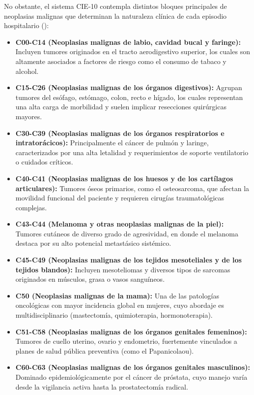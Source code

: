 No obstante, el sistema CIE-10 contempla distintos bloques principales de neoplasias malignas que determinan la naturaleza clínica de cada episodio hospitalario (\cite{paho}):

\begin{itemize}
	\label{item:tipos_cancer}
    \item \textbf{C00-C14 (Neoplasias malignas de labio, cavidad bucal y faringe):} Incluyen tumores originados en el tracto aerodigestivo superior, los cuales son altamente asociados a factores de riesgo como el consumo de tabaco y alcohol.
    \item \textbf{C15-C26 (Neoplasias malignas de los órganos digestivos):} Agrupan tumores del esófago, estómago, colon, recto e hígado, los cuales representan una alta carga de morbilidad y suelen implicar resecciones quirúrgicas mayores.
    \item \textbf{C30-C39 (Neoplasias malignas de los órganos respiratorios e intratorácicos):} Principalmente el cáncer de pulmón y laringe, caracterizados por una alta letalidad y requerimientos de soporte ventilatorio o cuidados críticos.
    \item \textbf{C40-C41 (Neoplasias malignas de los huesos y de los cartílagos articulares):} Tumores óseos primarios, como el osteosarcoma, que afectan la movilidad funcional del paciente y requieren cirugías traumatológicas complejas.
    \item \textbf{C43-C44 (Melanoma y otras neoplasias malignas de la piel):} Tumores cutáneos de diverso grado de agresividad, en donde el melanoma destaca por su alto potencial metastásico sistémico.
    \item \textbf{C45-C49 (Neoplasias malignas de los tejidos mesoteliales y de los tejidos blandos):} Incluyen mesoteliomas y diversos tipos de sarcomas originados en músculos, grasa o vasos sanguíneos.
    \item \textbf{C50 (Neoplasias malignas de la mama):} Una de las patologías oncológicas con mayor incidencia global en mujeres, cuyo abordaje es multidisciplinario (mastectomía, quimioterapia, hormonoterapia).
    \item \textbf{C51-C58 (Neoplasias malignas de los órganos genitales femeninos):} Tumores de cuello uterino, ovario y endometrio, fuertemente vinculados a planes de salud pública preventiva (como el Papanicolaou).
    \item \textbf{C60-C63 (Neoplasias malignas de los órganos genitales masculinos):} Dominado epidemiológicamente por el cáncer de próstata, cuyo manejo varía desde la vigilancia activa hasta la prostatectomía radical.

\end{itemize}
